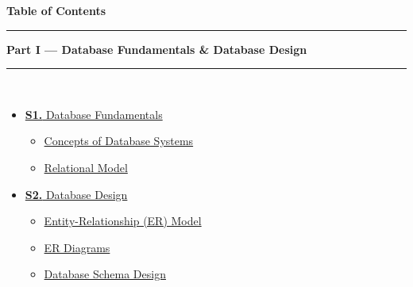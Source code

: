 \documentclass[12pt]{article}
\begin{document}
\thispagestyle{fancy}
\begin{center}
  {\LARGE\bfseries\textcolor{pblue}{Table of Contents}}\\[6pt]
  \textcolor{pblue}{\rule{0.6\textwidth}{0.8pt}}
\end{center}
\vspace{6pt}

\begin{tcolorbox}[breakable,colback=cA!5,colframe=cA,boxrule=1pt,arc=5pt,
  left=8pt,right=8pt,top=8pt,bottom=8pt,before skip=4pt]
  {\large\bfseries\textcolor{cA}{Part I --- Database Fundamentals \& Database Design}}\\[5pt]
  \textcolor{cA!40}{\rule{\textwidth}{0.4pt}}\\[3pt]
  \small\begin{itemize}[leftmargin=1.2em,itemsep=1pt,label={\textcolor{cA}{$\triangleright$}}]
    \item \hyperref[sec:S1]{\textbf{S1.} Database Fundamentals}
      \begin{itemize}[leftmargin=1.5em,itemsep=0pt,label={\textcolor{cA}{$\cdot$}}]
        \item \hyperref[sub:s1-concepts]{Concepts of Database Systems}
        \item \hyperref[sub:s1-relational]{Relational Model}
      \end{itemize}
    \item \hyperref[sec:S2]{\textbf{S2.} Database Design}
      \begin{itemize}[leftmargin=1.5em,itemsep=0pt,label={\textcolor{cA}{$\cdot$}}]
        \item \hyperref[sub:s2-er]{Entity-Relationship (ER) Model}
        \item \hyperref[sub:s2-erdiag]{ER Diagrams}
        \item \hyperref[sub:s2-schema]{Database Schema Design}
      \end{itemize}
  \end{itemize}
\end{tcolorbox}
\end{document}
